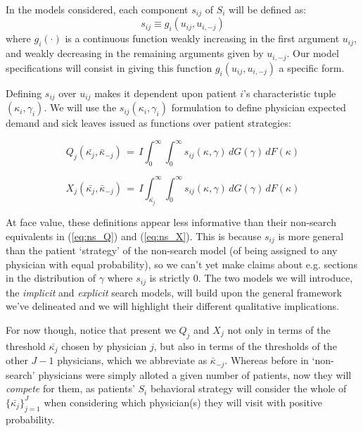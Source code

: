 \documentclass[../main.tex]{subfiles}
\begin{document}
In the models considered, each component $s_{ij}$ of $S_i$ will be defined as:
\[s_{ij} \equiv g_i(u_{ij}, u_{i,-j})\]
where $g_i(\cdot)$ is a continuous function weakly increasing in the first argument $u_{ij}$, and weakly decreasing in the remaining arguments given by $u_{i,-j}$. Our model specifications will consist in giving this function $g_i(u_{ij}, u_{i,-j})$ a specific form.

Defining $s_{ij}$ over $u_{ij}$ makes it dependent upon patient $i$'s characteristic tuple $(\kappa_i, \gamma_i)$. We will use the $s_{ij}(\kappa_i, \gamma_i)$ formulation to define physician expected demand and sick leaves issued as functions over patient strategies:

\begin{equation}
    Q_j(\bar{\kappa_j}, \bar{\kappa}_{-j}) \,=\, I \int_{0}^{\infty} \int_{0}^{\infty}s_{ij}(\kappa, \gamma) \,dG(\gamma) \,dF(\kappa)
    \label{eq:s_Q}
\end{equation}

\begin{equation}
    X_j(\bar{\kappa_j}, \bar{\kappa}_{-j}) \,=\, I \int_{\bar{\kappa_j}}^{\infty} \int_{0}^{\infty}s_{ij}(\kappa, \gamma)  \,dG(\gamma) \,dF(\kappa)
    \label{eq:s_X}
\end{equation}

At face value, these definitions appear less informative than their non-search equivalents in (\ref{eq:ns_Q}) and (\ref{eq:ns_X}). This is because $s_{ij}$ is more general than the patient `strategy' of the non-search model (of being assigned to any physician with equal probability), so we can't yet make claims about e.g. sections in the distribution of $\gamma$ where $s_{ij}$ is strictly 0. The two models we will introduce, the \textit{implicit} and \textit{explicit} search models, will build upon the general framework we've delineated and we will highlight their different qualitative implications.

For now though, notice that present we $Q_j$ and $X_j$  not only in terms of the threshold $\bar{\kappa_j}$ chosen by physician $j$, but also in terms of the thresholds of the other $J - 1$ physicians, which we abbreviate as $\bar{\kappa}_{-j}$. Whereas before in `non-search' physicians were simply alloted a given number of patients, now they will \textit{compete} for them, as patients' $S_i$ behavioral strategy will consider the whole of $\{\bar{\kappa_j}\}_{j =1}^{J}$ when considering which physician(s) they will visit with positive probability.
\end{document}
